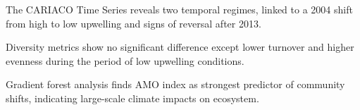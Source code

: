 \documentclass[]{agujournal2019}
\begin{document}






\begin{keypoints}
\item The CARIACO Time Series reveals two temporal regimes, linked to a 2004 shift from high to low upwelling and signs of reversal after 2013.
\item Diversity metrics show no significant difference except lower turnover and higher evenness during the period of low upwelling conditions.
\item Gradient forest analysis finds AMO index as strongest predictor of community shifts, indicating large-scale climate impacts on ecosystem.
\end{keypoints}

%
%

%
%
\end{document}

